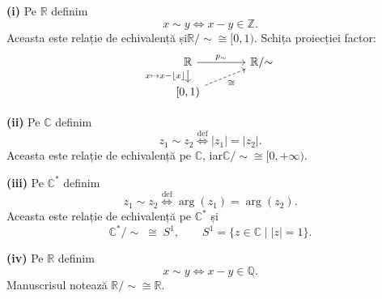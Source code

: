 \medskip
\noindent\textbf{(i)} Pe $\mathbb R$ definim
\[
 x\sim y\iff x-y\in\mathbb Z.
\]
Aceasta este relație de echivalență și\enspace\(\mathbb R/{\sim}\cong[0,1)\).
Schița proiecției factor:
\[
\begin{tikzcd}[column sep=large,row sep=small]
 \mathbb R\arrow[r,"p_{\sim}"]\arrow[d,"{x\mapsto x-\lfloor x\rfloor}"']
    & \mathbb R/{\sim} \\
 {[0,1)}\arrow[ur,dashed,"\cong"'] &
\end{tikzcd}
\]

\noindent\textbf{(ii)} Pe $\mathbb C$ definim
\[
 z_1\sim z_2\overset{\mathrm{def}}{\iff}|z_1|=|z_2|.
\]
Aceasta este relație de echivalență pe $\mathbb C$, iar\enspace\(\mathbb C/{\sim}\cong[0,+\infty)\).

\noindent\textbf{(iii)} Pe $\mathbb C^*$ definim
\[
 z_1\sim z_2\overset{\mathrm{def}}{\iff}
 \arg(z_1)=\arg(z_2).
\]
Aceasta este relație de echivalență pe $\mathbb C^*$ și
\[
 \mathbb C^*/{\sim}\;\cong\;S^1,
 \qquad S^1=\{z\in\mathbb C\mid |z|=1\}.
\]

\noindent\textbf{(iv)} Pe $\mathbb R$ definim
\[
 x\sim y\iff x-y\in\mathbb Q.
\]
Manuscrisul notează $\mathbb R/{\sim}\cong\mathbb R$.

\endgroup
